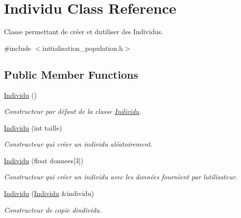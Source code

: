 \hypertarget{class_individu}{}\section{Individu Class Reference}
\label{class_individu}


Classe permettant de créer et d\textquotesingle{}utiliser des Individus.  




{\ttfamily \#include $<$initialisation\+\_\+population.\+h$>$}

\subsection*{Public Member Functions}
\begin{DoxyCompactItemize}
\item 
\mbox{\label{class_individu_ac35091404cfbf11946694806aefa9e7e}} 
\hyperlink{class_individu_ac35091404cfbf11946694806aefa9e7e}{Individu} ()
\begin{DoxyCompactList}\small\item\em Constructeur par défaut de la classe \hyperlink{class_individu}{Individu}. \end{DoxyCompactList}\item 
\hyperlink{class_individu_aeb49b6d2654ce47c70847d27a2608b47}{Individu} (int taille)
\begin{DoxyCompactList}\small\item\em Constructeur qui créer un individu aléatoirement. \end{DoxyCompactList}\item 
\hyperlink{class_individu_a04a849ab0b64d2bcb16cb8ce14c41f62}{Individu} (float donnees\mbox{[}3\mbox{]})
\begin{DoxyCompactList}\small\item\em Constructeur qui créer un individu avec les données fournient par l\textquotesingle{}utilisateur. \end{DoxyCompactList}\item 
\hyperlink{class_individu_a5347a6d253e44e3447731e4adec648dc}{Individu} (\hyperlink{class_individu}{Individu} \&individu)
\begin{DoxyCompactList}\small\item\em Constructeur de copie d\textquotesingle{}individu. \end{DoxyCompactList}\item 
\mbox{\label{class_individu_a84dcf2842927993d6c9ab833dfb6997a}} 

\end{DoxyCompactItemize}
